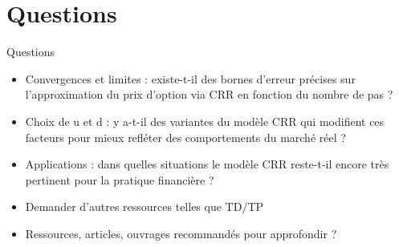 \documentclass[11pt]{beamer}
\begin{document}
\section{Questions}

\begin{frame}{Questions}
\begin{center}
    \begin{itemize}
        \item Convergences et limites : existe-t-il des bornes d’erreur précises sur l’approximation du prix d’option via CRR en fonction du nombre de pas ?
        \item Choix de u et d : y a-t-il des variantes du modèle CRR qui modifient ces facteurs pour mieux refléter des comportements du marché réel ?
        \item Applications :  dans quelles situations le modèle CRR reste-t-il encore très pertinent pour la pratique financière ?
        \item Demander d'autres ressources telles que TD/TP
        \item Ressources, articles, ouvrages recommandés pour approfondir ?
    \end{itemize}
\end{center}

\vspace{0.5cm}

\end{frame}
\end{document}
